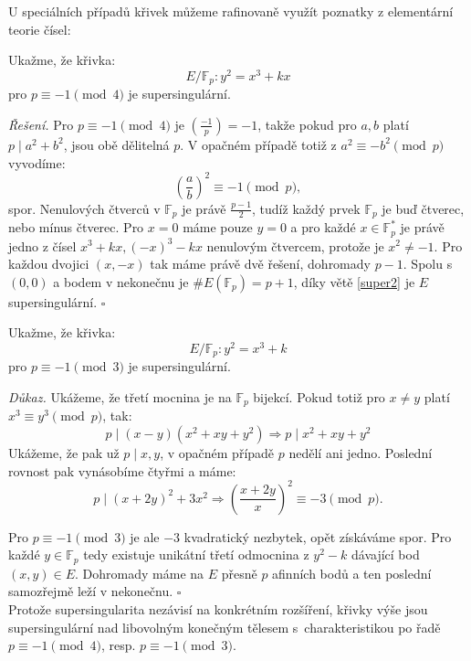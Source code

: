 \documentclass [12pt]{report}
\begin{document}
U speciálních případů křivek můžeme rafinovaně využít poznatky z elementární teorie čísel:

\begin{priklad}
Ukažme, že křivka:
 $$E/\mathbb{F}_p : y^2 = x^3 + kx$$
pro $ p \equiv -1 \pmod{4}$ je supersingulární.
\end{priklad}
\noindent \textit{Řešení.} Pro $p \equiv -1 \pmod{4}$ je $\genfrac{(}{)}{}{}{-1}{p} = -1$, takže pokud pro $a,b$ platí $p \mid a^2 + b^2$, jsou obě dělitelná $p$. V opačném případě totiž z $a^2 \equiv -b^2 \pmod{p}$ vyvodíme:
\begin{equation*}
\left(\frac{a}{b}\right)^2 \equiv -1 \pmod{p},
\end{equation*} 
spor. Nenulových čtverců v $\mathbb{F}_p$ je právě $\frac{p-1}{2}$, tudíž každý prvek $\mathbb{F}_p$ je buď čtverec, nebo mínus čtverec. Pro $x= 0$ máme pouze $y = 0$ a pro každé $x \in \mathbb{F}_p^*$ je právě jedno z čísel $x^3+kx, (-x)^3-kx$ nenulovým čtvercem, protože je $x^2 \neq -1$. Pro každou dvojici $(x,-x)$ tak máme právě dvě řešení, dohromady $p-1$. Spolu s $(0,0)$ a bodem v nekonečnu je $\# E(\mathbb{F}_p) = p+1$, díky větě \ref{super2} je $E$ supersingulární. \hfill $\square$\\

\begin{priklad}
Ukažme, že křivka:
 $$E/\mathbb{F}_p : y^2 = x^3 + k$$
pro $ p \equiv -1 \pmod{3}$ je supersingulární.
\end{priklad}
\noindent \textit{Důkaz.} Ukážeme, že třetí mocnina je na $\mathbb{F}_p$ bijekcí. Pokud totiž pro $x \neq y$ platí $x^3 \equiv y^3 \pmod{p}$, tak:
\begin{equation*}
p \mid (x-y)(x^2+xy+y^2) \Rightarrow p \mid x^2+xy+y^2 
\end{equation*}
Ukážeme, že pak už $p \mid x,y$, v opačném případě $p$ nedělí ani jedno. Poslední rovnost pak vynásobíme čtyřmi a máme:
\begin{equation*}
p \mid (x+2y)^2 + 3 x^2 \Rightarrow \left(\frac{x+2y}{x} \right)^2 \equiv -3 \pmod{p}.
\end{equation*}

Pro $p \equiv -1 \pmod{3}$ je ale $-3$ kvadratický nezbytek, opět získáváme spor. Pro každé $y \in \mathbb{F}_p$ tedy existuje unikátní třetí odmocnina z $y^2 - k$ dávající bod $(x,y) \in E$. Dohromady máme na $E$ přesně $p$ afinních bodů a ten poslední samozřejmě leží v nekonečnu. \hfill $\square$\\

Protože supersingularita nezávisí na konkrétním rozšíření, křivky výše jsou supersingulární nad libovolným konečným tělesem s~charakteristikou po řadě $p \equiv -1 \pmod{4}$, resp. $p \equiv -1 \pmod{3}$.\\
\end{document}
